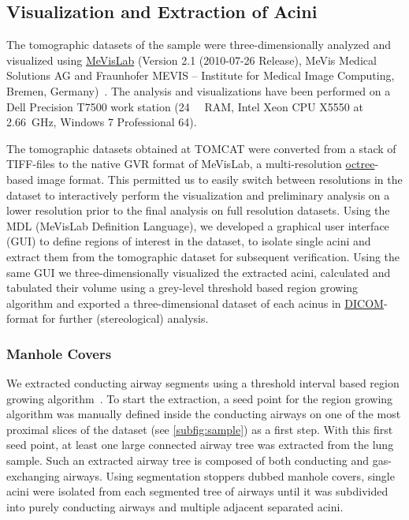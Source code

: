 \documentclass[a4paper,DIVcalc,abstract,english]{scrartcl}
\begin{document}
\subsection{Visualization and Extraction of Acini}
The tomographic datasets of the sample were three-dimensionally analyzed and visualized using \href{http://mevislab.de}{MeVisLab} (Version 2.1 (2010-07-26 Release), MeVis Medical Solutions AG and Fraunhofer MEVIS -- Institute for Medical Image Computing, Bremen, Germany)~\cite{Bitter2007}.
The analysis and visualizations have been performed on a Dell Precision T7500 work station (\SI{24}{\giga\byte} RAM, Intel Xeon CPU X5550 at \SI{2.66}{\giga\hertz}, Windows 7 Professional \SI{64}{\bit}).

The tomographic datasets obtained at TOMCAT were converted from a stack of TIFF-files to the native GVR format of MeVisLab, a multi-resolution \href{https://secure.wikimedia.org/wikipedia/en/w/index.php?title=Octree&oldid=409131920}{octree}-based image format.
This permitted us to easily switch between resolutions in the dataset to interactively perform the visualization and preliminary analysis on a lower resolution prior to the final analysis on full resolution datasets.
Using the MDL (MeVisLab Definition Language), we developed a graphical user interface (GUI) to define regions of interest in the dataset, to isolate single acini and extract them from the tomographic dataset for subsequent verification.
Using the same GUI we three-dimensionally visualized the extracted acini, calculated and tabulated their volume using a grey-level threshold based region growing algorithm and exported a three-dimensional dataset of each acinus in \href{http://en.wikipedia.org/w/index.php?title=DICOM&oldid=511155074}{DICOM}-format for further (stereological) analysis.

\subsubsection{Manhole Covers}
We extracted conducting airway segments using a threshold interval based region growing algorithm~\cite{Zucker1976}.
To start the extraction, a seed point for the region growing algorithm was manually defined inside the conducting airways on one of the most proximal slices of the dataset (see \autoref{subfig:sample}) as a first step.
With this first seed point, at least one large connected airway tree was extracted from the lung sample.
Such an extracted airway tree is composed of both conducting and gas-exchanging airways.
Using segmentation stoppers dubbed manhole covers, single acini were isolated from each segmented tree of airways until it was subdivided into purely conducting airways and multiple adjacent separated acini. 
\end{document}
